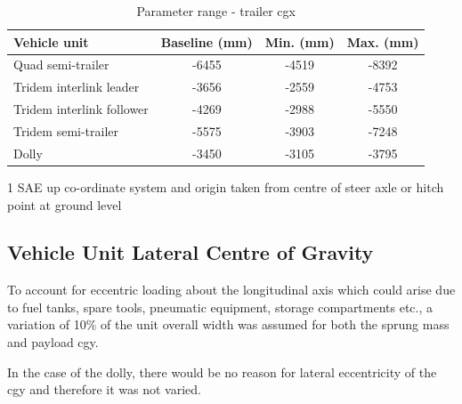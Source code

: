 \begin{table}[H]
	\centering\footnotesize
	\begin{threeparttable}

		\begin{tabulary}{\textwidth}{lccc}
			\toprule
			\textbf{Vehicle unit} & \textbf{Baseline (mm)} & \textbf{Min. (mm)} & \textbf{Max. (mm)} \\
			\midrule
             Quad semi-trailer & -6455 & -4519 & -8392 \\
             Tridem interlink leader & -3656 & -2559 & -4753 \\
             Tridem interlink follower & -4269 & -2988 & -5550 \\
             Tridem semi-trailer & -5575 & -3903 & -7248 \\
             Dolly & -3450 & -3105 & -3795 \\
			\bottomrule
		\end{tabulary}

		\caption{Parameter range - trailer \gls{cgx}}
		\label{table:parameter-range-cgx-trailer}

		\begin{tablenotes}
			\item[1] SAE up co-ordinate system and origin taken from centre of steer axle or hitch point at ground level
		\end{tablenotes}

	\end{threeparttable}
\end{table}

\subsection{Vehicle Unit Lateral Centre of Gravity}\label{section:pr-cgy-vehicle-units}

To account for eccentric loading about the longitudinal axis which could arise due to fuel tanks, spare tools, pneumatic equipment, storage compartments etc., a variation of 10\% of the unit overall width was assumed for both the sprung mass and payload \gls{cgy}.

In the case of the dolly, there would be no reason for lateral eccentricity of the \gls{cgy} and therefore it was not varied.

